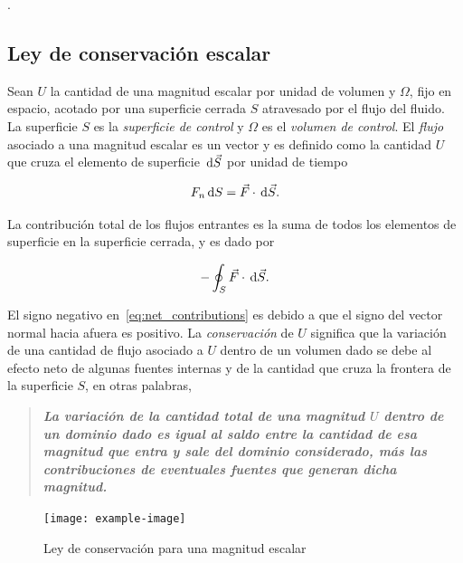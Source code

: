 \begin{theorem}
	.
\end{theorem}

\subsection{Ley de conservación escalar}

Sean $U$ la cantidad de una magnitud escalar por unidad de volumen y
$\Omega$, fijo en espacio, acotado por una superficie cerrada $S$
atravesado por el flujo del fluido.
La superficie $S$ es la \emph{superficie de control} y $\Omega$ es el
\emph{volumen de control}.
El \emph{flujo} asociado a una magnitud escalar es un vector y es
definido como la cantidad $U$ que cruza el elemento de superficie
$\dl{\vec{S}}$ por unidad de tiempo

\begin{equation*}
	F_{n}\dl S=
	\vec{F}\cdot
	\dl{\vec{S}}.
\end{equation*}

La contribución total de los flujos entrantes es la suma de todos los
elementos de superficie en la superficie cerrada, y es dado por

\begin{equation}
	-\oint_{S}
	\vec{F}\cdot
	\dl{\vec{S}}.\label{eq:net_contributions}
\end{equation}

El signo negativo en~\eqref{eq:net_contributions} es debido a que el
signo del vector normal hacia afuera es positivo.
La \emph{conservación} de $U$ significa que la variación de una
cantidad de flujo asociado a $U$ dentro de un volumen dado se debe al
efecto neto de algunas fuentes internas y de la cantidad que cruza la
frontera de la superficie $S$, en otras palabras,

\begin{quotation}
	\bfseries\itshape\color{DarkBlue}
	La variación de la cantidad total de una magnitud $U$ dentro
	de un dominio dado es igual al saldo entre la cantidad de esa
	magnitud que entra y sale del dominio considerado, más las
	contribuciones de eventuales fuentes que generan dicha magnitud.
\end{quotation}

\begin{figure}[ht!]
	\centering
	\texttt{[image: example-image]}
	\caption[short]{Ley de conservación para una magnitud escalar}
\end{figure}

